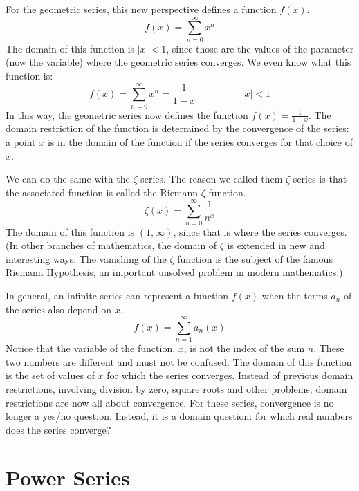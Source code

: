 \documentclass[fleqn,letterpaper]{report}
\begin{document}
For the geometric series, this new perspective defines a
function $f(x)$.
\begin{equation*}
f(x) = \sum_{n=0}^\infty x^n
\end{equation*}
The domain of this function is $|x|<1$, since those are the
values of the parameter (now the variable) where the geometric
series converges. We even know what this function is:
\begin{equation*}
f(x) = \sum_{n=0}^\infty x^n = \frac{1}{1-x} \hspace{2cm} |x|
< 1
\end{equation*}
In this way, the geometric series now defines the function
$f(x) = \frac{1}{1-x}$. The domain restriction of the function
is determined by the convergence of the series: a point $x$ is
in the domain of the function if the series converges for that
choice of $x$.

We can do the same with the $\zeta$ series. The reason we
called them $\zeta$ series is that the associated function is
called the Riemann $\zeta$-function. 
\begin{equation*}
\zeta(x) = \sum_{n=0}^\infty \frac{1}{n^x}
\end{equation*}
The domain of this function is $(1,\infty)$, since that is
where the series converges. (In other branches of
mathematics, the domain of $\zeta$ is extended
in new and interesting ways. The vanishing of the $\zeta$
function is the subject of the famous Riemann Hypothesis, an
important unsolved problem in modern mathematics.) 

In general, an infinite series can represent a function $f(x)$
when the terms $a_n$ of the series also depend on $x$.
\begin{equation*}
f(x) = \sum_{n=1}^\infty a_n(x)
\end{equation*}
Notice that the variable of the function, $x$, is not the index
of the sum $n$. These two numbers are different and must not be
confused. The domain of this function is the set of values of
$x$ for which the series converges. Instead of previous
domain restrictions, involving division by zero, square roots
and other problems, domain restrictions are now all about
convergence. For these series, convergence is no longer a
yes/no question. Instead, it is a domain question: for which
real numbers does the series converge?

\section{Power Series}
\label{power-series}
\end{document}

